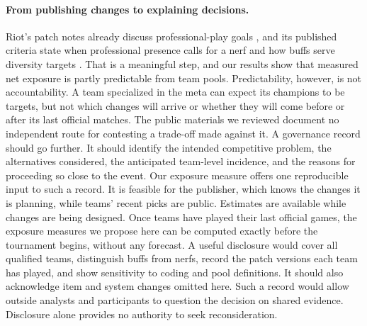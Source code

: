 \documentclass[11pt]{article}
\begin{document}
\paragraph{From publishing changes to explaining decisions.} Riot's patch notes already discuss professional-play goals \citep{riot1319,riot1418}, and its published criteria state when professional presence calls for a nerf and how buffs serve diversity targets \citep{riot2020proplay,riot2020framework}. That is a meaningful step, and our results show that measured net exposure is partly predictable from team pools. Predictability, however, is not accountability. A team specialized in the meta can expect its champions to be targets, but not which changes will arrive or whether they will come before or after its last official matches. The public materials we reviewed document no independent route for contesting a trade-off made against it. A governance record should go further. It should identify the intended competitive problem, the alternatives considered, the anticipated team-level incidence, and the reasons for proceeding so close to the event. Our exposure measure offers one reproducible input to such a record. It is feasible for the publisher, which knows the changes it is planning, while teams' recent picks are public. Estimates are available while changes are being designed. Once teams have played their last official games, the exposure measures we propose here can be computed exactly before the tournament begins, without any forecast. A useful disclosure would cover all qualified teams, distinguish buffs from nerfs, record the patch versions each team has played, and show sensitivity to coding and pool definitions. It should also acknowledge item and system changes omitted here. Such a record would allow outside analysts and participants to question the decision on shared evidence. Disclosure alone provides no authority to seek reconsideration.
\end{document}
